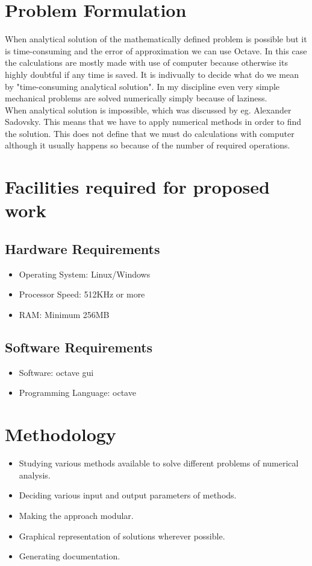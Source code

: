 
\section{Problem Formulation}
 When analytical solution of the mathematically defined problem is possible but it is time-consuming and the error of approximation we can use Octave. In this case the calculations are mostly made with use of computer because otherwise its highly doubtful if any time is saved. It is indivually to decide what do we mean by "time-consuming analytical solution". In my discipline even very simple mechanical problems are solved numerically simply because of laziness. \\
\noindent When analytical solution is impossible, which was discussed by eg. Alexander Sadovsky. This means that we have to apply numerical methods in order to find the solution. This does not define that we must do calculations with computer although it usually happens so because of the number of required operations.

\section{Facilities required for proposed work}
\subsection{Hardware Requirements}
\begin{itemize}
\item Operating System: Linux/Windows
\item Processor Speed: 512KHz or more
\item RAM: Minimum 256MB
\end{itemize}
\subsection{Software Requirements}
\begin{itemize}
\item Software: octave gui
\item Programming Language: octave
\end{itemize}

\section{Methodology}
\begin{itemize}
\item Studying various methods available to solve different problems of numerical analysis.
\item Deciding various input and output parameters of methods.
\item Making the approach modular.
\item Graphical representation of solutions wherever possible.
\item Generating documentation.
\end{itemize}


